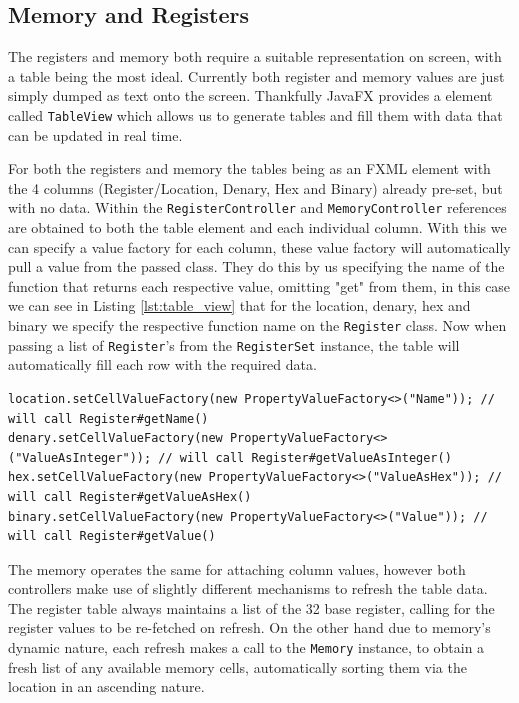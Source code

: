 \subsection{Memory and Registers}
The registers and memory both require a suitable representation on screen, with a table being the most ideal. Currently both register and memory values are just simply dumped as text onto the screen. Thankfully JavaFX \cite{sunmicrosystems_2022_javafx} provides a element called \texttt{TableView} which allows us to generate tables and fill them with data that can be updated in real time.

For both the registers and memory the tables being as an FXML element with the 4 columns (Register/Location, Denary, Hex and Binary) already pre-set, but with no data. Within the \texttt{RegisterController} and \texttt{MemoryController} references are obtained to both the table element and each individual column. With this we can specify a value factory for each column, these value factory will automatically pull a value from the passed class. They do this by us specifying the name of the function that returns each respective value, omitting "get" from them, in this case we can see in Listing \ref{lst:table_view} that for the location, denary, hex and binary we specify the respective function name on the \texttt{Register} class. Now when passing a list of \texttt{Register}'s from the \texttt{RegisterSet} instance, the table will automatically fill each row with the required data.

\begin{lstlisting}[caption=\texttt{RegisterController} code to obtain column values, label=lst:table_view]
location.setCellValueFactory(new PropertyValueFactory<>("Name")); // will call Register#getName()
denary.setCellValueFactory(new PropertyValueFactory<>("ValueAsInteger")); // will call Register#getValueAsInteger()
hex.setCellValueFactory(new PropertyValueFactory<>("ValueAsHex")); // will call Register#getValueAsHex()
binary.setCellValueFactory(new PropertyValueFactory<>("Value")); // will call Register#getValue()
\end{lstlisting}

The memory operates the same for attaching column values, however both controllers make use of slightly different mechanisms to refresh the table data. The register table always maintains a list of the 32 base register, calling for the register values to be re-fetched on refresh. On the other hand due to memory's dynamic nature, each refresh makes a call to the \texttt{Memory} instance, to obtain a fresh list of any available memory cells, automatically sorting them via the location in an ascending nature.

